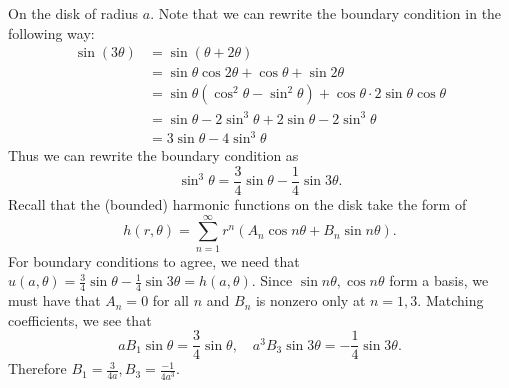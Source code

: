 \documentclass[12pt, a4paper]{article}
\theoremstyle{definition}
\begin{document}
On the disk of radius $a$. Note that we can rewrite the boundary condition in the following way: 
\begin{align*}\sin(3\theta) &= \sin(\theta + 2\theta) 
	 \\& = \sin \theta \cos 2\theta + \cos \theta + \sin 2\theta \tag{angle duplication identity}
	 \\ & = \sin \theta \left(\cos^2  \theta - \sin^2 \theta \right) + \cos \theta \cdot 2 \sin \theta \cos \theta
	 \\ & = \sin \theta - 2\sin^3 \theta + 2\sin \theta - 2\sin^3 \theta \tag{pythagoras'   theorem}
	 \\ & = 3\sin \theta - 4 \sin^3 \theta
\end{align*}
Thus we can rewrite the boundary condition as $$\sin^3 \theta = \frac{3}{4}\sin \theta - \frac{1}{4} \sin 3 \theta.$$
Recall that the (bounded) harmonic functions on the disk take the form of
$$h(r, \theta) = \sum_{n=1}^\infty  r^n \left(A_n \cos n\theta + B_n \sin n\theta \right).$$
For boundary conditions to agree, we need that $u(a,\theta) = \frac{3}{4}\sin \theta - \frac{1}{4} \sin 3 \theta= h(a, \theta)$. Since $\sin n\theta, \cos n\theta$ form a basis, we must have that $A_n = 0$ for all $n$ and $B_n$ is nonzero only at $n=1,3$. Matching coefficients, we see that 
$$a B_1 \sin \theta = \frac{3}{4} \sin \theta, \quad  a^3 B_3 \sin 3\theta = -\frac{1}{4} \sin 3\theta.$$
Therefore $B_1= \frac{3}{4a}, B_3 = \frac{-1}{4a^3}$. 
\end{document}
